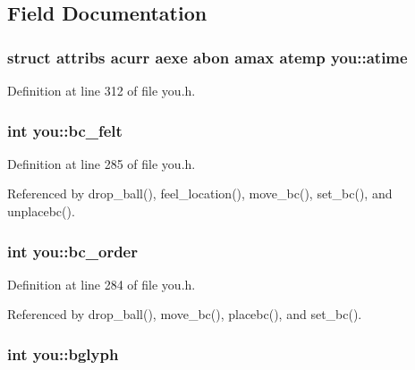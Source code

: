 \subsection{Field Documentation}
\hypertarget{structyou_ad3879d72ecdd6195b3fa399694baded2}{
\subsubsection[{atime}]{\setlength{\rightskip}{0pt plus 5cm}struct {\bf attribs} acurr aexe abon amax atemp you\+::atime}}\label{structyou_ad3879d72ecdd6195b3fa399694baded2}


Definition at line 312 of file you.\+h.

\hypertarget{structyou_a3d3a16319933c6301b41ba9e1ed0fc3e}{
\subsubsection[{bc\+\_\+felt}]{\setlength{\rightskip}{0pt plus 5cm}int you\+::bc\+\_\+felt}}\label{structyou_a3d3a16319933c6301b41ba9e1ed0fc3e}


Definition at line 285 of file you.\+h.



Referenced by drop\+\_\+ball(), feel\+\_\+location(), move\+\_\+bc(), set\+\_\+bc(), and unplacebc().

\hypertarget{structyou_acf0adfb1b19b6ae98a85fda17829c994}{
\subsubsection[{bc\+\_\+order}]{\setlength{\rightskip}{0pt plus 5cm}int you\+::bc\+\_\+order}}\label{structyou_acf0adfb1b19b6ae98a85fda17829c994}


Definition at line 284 of file you.\+h.



Referenced by drop\+\_\+ball(), move\+\_\+bc(), placebc(), and set\+\_\+bc().

\hypertarget{structyou_afb1ab0ddc249cdae37545533aa363c38}{
\subsubsection[{bglyph}]{\setlength{\rightskip}{0pt plus 5cm}int you\+::bglyph}}\label{structyou_afb1ab0ddc249cdae37545533aa363c38}



